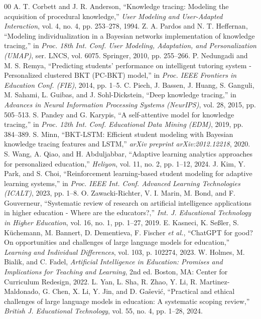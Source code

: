 \documentclass[conference]{IEEEtran}
\begin{document}
\begin{thebibliography}{00}
 A. T. Corbett and J. R. Anderson, ``Knowledge tracing: Modeling the acquisition of procedural knowledge,'' \textit{User Modeling and User-Adapted Interaction}, vol. 4, no. 4, pp. 253--278, 1994.
 Z. A. Pardos and N. T. Heffernan, ``Modeling individualization in a Bayesian networks implementation of knowledge tracing,'' in \textit{Proc. 18th Int. Conf. User Modeling, Adaptation, and Personalization (UMAP)}, ser. LNCS, vol. 6075. Springer, 2010, pp. 255--266.
 P. Nedungadi and M. S. Remya, ``Predicting students' performance on intelligent tutoring system - Personalized clustered BKT (PC-BKT) model,'' in \textit{Proc. IEEE Frontiers in Education Conf. (FIE)}, 2014, pp. 1--5.
 C. Piech, J. Bassen, J. Huang, S. Ganguli, M. Sahami, L. Guibas, and J. Sohl-Dickstein, ``Deep knowledge tracing,'' in \textit{Advances in Neural Information Processing Systems (NeurIPS)}, vol. 28, 2015, pp. 505--513.
 S. Pandey and G. Karypis, ``A self-attentive model for knowledge tracing,'' in \textit{Proc. 12th Int. Conf. Educational Data Mining (EDM)}, 2019, pp. 384--389.
 S. Minn, ``BKT-LSTM: Efficient student modeling with Bayesian knowledge tracing features and LSTM,'' \textit{arXiv preprint arXiv:2012.12218}, 2020.
 S. Wang, A. Qiao, and H. Abduljabbar, ``Adaptive learning analytics approaches for personalized education,'' \textit{Heliyon}, vol. 11, no. 2, pp. 1--12, 2024.
 J. Kim, Y. Park, and S. Choi, ``Reinforcement learning-based student modeling for adaptive learning systems,'' in \textit{Proc. IEEE Int. Conf. Advanced Learning Technologies (ICALT)}, 2023, pp. 1--8.
 O. Zawacki-Richter, V. I. Marin, M. Bond, and F. Gouverneur, ``Systematic review of research on artificial intelligence applications in higher education - Where are the educators?,'' \textit{Int. J. Educational Technology in Higher Education}, vol. 16, no. 1, pp. 1--27, 2019.
 E. Kasneci, K. Se{\ss}ler, S. K\"{u}chemann, M. Bannert, D. Dementieva, F. Fischer \textit{et al.}, ``ChatGPT for good? On opportunities and challenges of large language models for education,'' \textit{Learning and Individual Differences}, vol. 103, p. 102274, 2023.
 W. Holmes, M. Bialik, and C. Fadel, \textit{Artificial Intelligence in Education: Promises and Implications for Teaching and Learning}, 2nd ed. Boston, MA: Center for Curriculum Redesign, 2022.
 L. Yan, L. Sha, R. Zhao, Y. Li, R. Martinez-Maldonado, G. Chen, X. Li, Y. Jin, and D. Ga\v{s}evi\'{c}, ``Practical and ethical challenges of large language models in education: A systematic scoping review,'' \textit{British J. Educational Technology}, vol. 55, no. 4, pp. 1--28, 2024.

\end{thebibliography}
\end{document}
